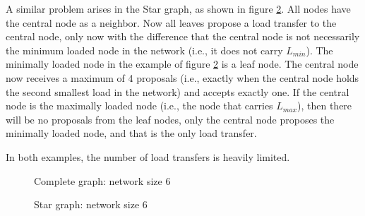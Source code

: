 A similar problem arises in the Star graph, as shown in figure \ref{fig:specialstargraphDemo}. All nodes have the central node as a neighbor. Now all leaves propose a load transfer to the central node, only now with the difference that the central node is not necessarily the minimum loaded node in the network (i.e., it does not carry $L_{min}$). The minimally loaded node in the example of figure \ref{fig:specialstargraphDemo} is a leaf node. The central node now receives a maximum of 4 proposals (i.e., exactly when the central node holds the second smallest load in the network) and accepts exactly one. If the central node is the maximally loaded node (i.e., the node that carries $L_{max}$), then there will be no proposals from the leaf nodes, only the central node proposes the minimally loaded node, and that is the only load transfer.

In both examples, the number of load transfers is heavily limited.
\begin{figure}[]
    \centering
    
    \caption{Complete graph: network size 6}
    \label{fig:specialcompletegraphDemo}
\end{figure}
\begin{figure}[]
    \centering
    
    \caption{Star graph: network size 6}
    \label{fig:specialstargraphDemo}
\end{figure}